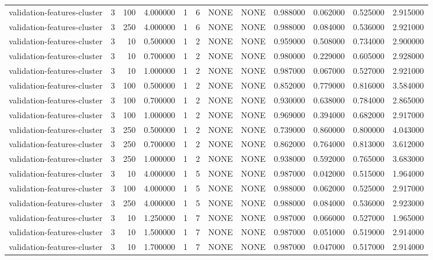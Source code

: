\begin{tabular}{lrrrllllrrrr}
validation-features-cluster & 3 & 100 & 4.000000 & 1 & 6 & NONE & NONE & 0.988000 & 0.062000 & 0.525000 & 2.915000 \\
validation-features-cluster & 3 & 250 & 4.000000 & 1 & 6 & NONE & NONE & 0.988000 & 0.084000 & 0.536000 & 2.921000 \\
validation-features-cluster & 3 & 10 & 0.500000 & 1 & 2 & NONE & NONE & 0.959000 & 0.508000 & 0.734000 & 2.900000 \\
validation-features-cluster & 3 & 10 & 0.700000 & 1 & 2 & NONE & NONE & 0.980000 & 0.229000 & 0.605000 & 2.928000 \\
validation-features-cluster & 3 & 10 & 1.000000 & 1 & 2 & NONE & NONE & 0.987000 & 0.067000 & 0.527000 & 2.921000 \\
validation-features-cluster & 3 & 100 & 0.500000 & 1 & 2 & NONE & NONE & 0.852000 & 0.779000 & 0.816000 & 3.584000 \\
validation-features-cluster & 3 & 100 & 0.700000 & 1 & 2 & NONE & NONE & 0.930000 & 0.638000 & 0.784000 & 2.865000 \\
validation-features-cluster & 3 & 100 & 1.000000 & 1 & 2 & NONE & NONE & 0.969000 & 0.394000 & 0.682000 & 2.917000 \\
validation-features-cluster & 3 & 250 & 0.500000 & 1 & 2 & NONE & NONE & 0.739000 & 0.860000 & 0.800000 & 4.043000 \\
validation-features-cluster & 3 & 250 & 0.700000 & 1 & 2 & NONE & NONE & 0.862000 & 0.764000 & 0.813000 & 3.612000 \\
validation-features-cluster & 3 & 250 & 1.000000 & 1 & 2 & NONE & NONE & 0.938000 & 0.592000 & 0.765000 & 3.683000 \\
validation-features-cluster & 3 & 10 & 4.000000 & 1 & 5 & NONE & NONE & 0.987000 & 0.042000 & 0.515000 & 1.964000 \\
validation-features-cluster & 3 & 100 & 4.000000 & 1 & 5 & NONE & NONE & 0.988000 & 0.062000 & 0.525000 & 2.917000 \\
validation-features-cluster & 3 & 250 & 4.000000 & 1 & 5 & NONE & NONE & 0.988000 & 0.084000 & 0.536000 & 2.923000 \\
validation-features-cluster & 3 & 10 & 1.250000 & 1 & 7 & NONE & NONE & 0.987000 & 0.066000 & 0.527000 & 1.965000 \\
validation-features-cluster & 3 & 10 & 1.500000 & 1 & 7 & NONE & NONE & 0.987000 & 0.051000 & 0.519000 & 2.914000 \\
validation-features-cluster & 3 & 10 & 1.700000 & 1 & 7 & NONE & NONE & 0.987000 & 0.047000 & 0.517000 & 2.914000 \\

\end{tabular}
